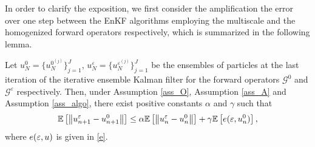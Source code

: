 \documentclass[10pt]{article}
\begin{document}
In order to clarify the exposition, we first consider the amplification the error over one step between the EnKF algorithms employing the multiscale and the homogenized forward operators respectively, which is summarized in the following lemma.
\begin{lemma} \label{convergence_local} Let $u_{N}^0 = \{ u_{N}^{0^{(j)}} \}_{j=1}^J$, $u_N^{\varepsilon} = \{ u_N^{\varepsilon^{(j)}} \}_{j=1}^J$ be the ensembles of particles at the last iteration of the iterative ensemble Kalman filter for the forward operators $\mathcal{G}^0$ and $\mathcal{G}^{\varepsilon}$ respectively. Then, under Assumption \ref{ass_O}, Assumption \ref{ass_A} and Assumption \ref{ass_algo},	there exist positive constants $\alpha$ and $\gamma$ such that
\begin{equation}
\mathbb{E} \left [ \left\|u_{n+1}^{\varepsilon} - u_{n+1}^0\right\| \right ] \le \alpha \mathbb{E} \left [ \left\|u_n^{\varepsilon} - u_n^0\right\| \right ] + \gamma \mathbb{E} \left [ e(\varepsilon, u_n^0) \right ],
\end{equation}
where $e(\varepsilon, u)$ is given in \eqref{e}.
\end{lemma}
\end{document}
